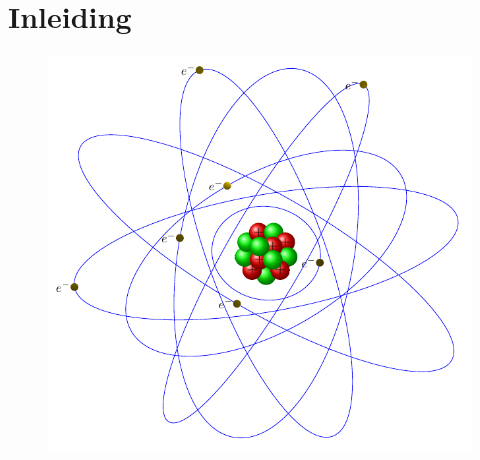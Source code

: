 \documentclass[11pt,twoside]{book}
\begin{document}
\chapter{Inleiding}
\begin{figure}[h!]
\centering
\includegraphics[scale=0.75]{./figuren/introduction}
\end{figure}
\end{document}

